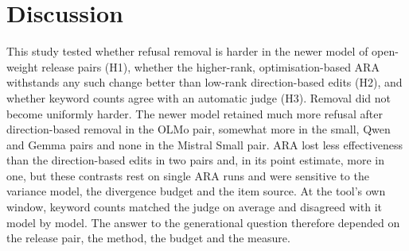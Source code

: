 \section{Discussion}
\label{sec:discussion}

This study tested whether refusal removal is harder in the newer model of
open-weight release pairs (H1), whether the higher-rank, optimisation-based
ARA withstands any such change better than low-rank direction-based edits
(H2), and whether keyword counts agree with an automatic judge (H3). Removal
did not become uniformly harder. The newer model retained much more refusal
after direction-based removal in the OLMo pair, somewhat more in the small,
Qwen and Gemma pairs and none in the Mistral Small pair. ARA lost less
effectiveness than the direction-based edits in two pairs and, in its point
estimate, more in one, but these contrasts rest on single ARA runs and were sensitive to the variance
model, the divergence budget and the item source. At the tool's own window,
keyword counts matched the judge on average and disagreed with it model by
model. The answer to the generational question therefore depended on the
release pair, the method, the budget and the measure.


